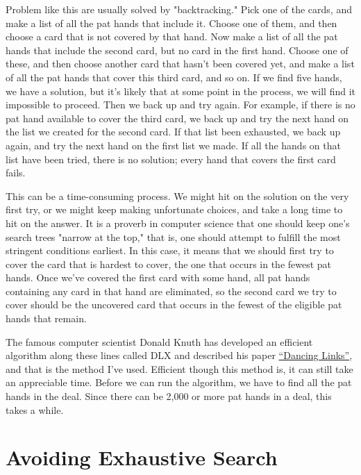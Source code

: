 \documentclass [12pt, letterpaper] {article}
\begin{document}
Problem like this are usually solved by "backtracking."  Pick one of the cards, and make a list of all the pat
hands that include it.  Choose one of them, and then choose a card that is not covered by that hand.  Now make a
list of all the pat hands that include the second card, but no card in the first hand.  Choose one of these,
and then choose another card that hasn't been covered yet, and make a list of all the pat hands that cover this third 
card, and so on.  If we find five hands, we have a solution, but it's likely that at some point in the process, we 
will find it impossible to proceed.  Then we back up and try again.  For example, if there is no pat hand available
to cover the third card, we back up and try the next hand on the list we created for the second card.  If that list
been exhausted, we back up again, and try the next hand on the first list we made.  If all the hands on that list have 
been tried, there is no solution; every hand that covers the first card fails.

This can be a time-consuming process.  We might hit on the solution on the very first try, or we might keep making unfortunate
choices, and take a long time to hit on the answer. It is a proverb in computer science that one should keep one's search trees
"narrow at the top," that is, one should attempt to fulfill the most stringent conditions earliest.  In this case, it means 
that we should first try to cover the card that is hardest to cover, the one that occurs in the fewest pat hands.  Once we've
covered the first card with some hand, all pat hands containing any card in that hand are eliminated, so the second card we 
try to cover should be the uncovered card that occurs in the fewest of the eligible pat hands that remain.

The famous computer scientist Donald Knuth has developed an efficient algorithm along these lines called DLX and described his paper  
\href{https://arxiv.org/abs/cs/0011047}{``Dancing Links''}, and that is the method I've used.  Efficient though this
method is, it can still take an appreciable time.  Before we can run the algorithm, we have to find all the pat hands in the deal.  
Since there can be 2,000 or more pat hands in a deal, this takes a while.

\section*{Avoiding Exhaustive Search}
\end{document}
